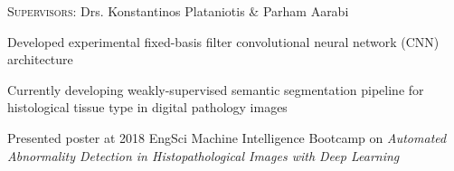 \documentclass[12pt]{cv_style}
\begin{document}
\newpage
\textsc{Supervisors:} Drs. Konstantinos Plataniotis \& Parham Aarabi
\begin{ditem}
	\item Developed experimental fixed-basis filter convolutional neural network (CNN) architecture
	\item Currently developing weakly-supervised semantic segmentation pipeline for histological tissue type in digital pathology images
	\item Presented poster at 2018 EngSci Machine Intelligence Bootcamp on \emph{Automated Abnormality Detection in Histopathological Images
with Deep Learning}
\end{ditem}
\end{document}
